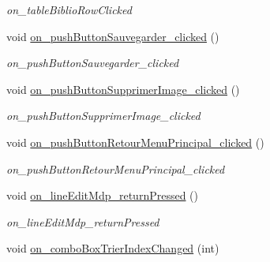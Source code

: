 \begin{DoxyCompactItemize}
\begin{DoxyCompactList}\small\item\em on\+\_\+table\+Biblio\+Row\+Clicked \end{DoxyCompactList}\item 
\mbox{\label{classAppMainWindow_abdc070ca216fd50485b42d8b5634c2cd}} 
void \hyperlink{classAppMainWindow_abdc070ca216fd50485b42d8b5634c2cd}{on\+\_\+push\+Button\+Sauvegarder\+\_\+clicked} ()
\begin{DoxyCompactList}\small\item\em on\+\_\+push\+Button\+Sauvegarder\+\_\+clicked \end{DoxyCompactList}\item 
\mbox{\label{classAppMainWindow_a63b12959410f1c4cdcf2ec429d0757ac}} 
void \hyperlink{classAppMainWindow_a63b12959410f1c4cdcf2ec429d0757ac}{on\+\_\+push\+Button\+Supprimer\+Image\+\_\+clicked} ()
\begin{DoxyCompactList}\small\item\em on\+\_\+push\+Button\+Supprimer\+Image\+\_\+clicked \end{DoxyCompactList}\item 
\mbox{\label{classAppMainWindow_a48ca3eef57a64ce991111e6d06995711}} 
void \hyperlink{classAppMainWindow_a48ca3eef57a64ce991111e6d06995711}{on\+\_\+push\+Button\+Retour\+Menu\+Principal\+\_\+clicked} ()
\begin{DoxyCompactList}\small\item\em on\+\_\+push\+Button\+Retour\+Menu\+Principal\+\_\+clicked \end{DoxyCompactList}\item 
\mbox{\label{classAppMainWindow_a613b1fa991ada095afd521f8ec1049b8}} 
void \hyperlink{classAppMainWindow_a613b1fa991ada095afd521f8ec1049b8}{on\+\_\+line\+Edit\+Mdp\+\_\+return\+Pressed} ()
\begin{DoxyCompactList}\small\item\em on\+\_\+line\+Edit\+Mdp\+\_\+return\+Pressed \end{DoxyCompactList}\item 
\mbox{\label{classAppMainWindow_a8aaafc24ce68ff58b2c96177b237db52}} 
void \hyperlink{classAppMainWindow_a8aaafc24ce68ff58b2c96177b237db52}{on\+\_\+combo\+Box\+Trier\+Index\+Changed} (int)

\end{DoxyCompactItemize}
